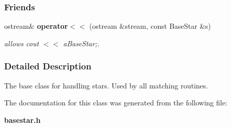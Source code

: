 \subsubsection*{Friends}
\begin{CompactItemize}
\item 
{}
ostream\& {\bf operator$<$$<$} (ostream \&stream, const Base\-Star \&s)\label{class_basestar_l0}

\begin{CompactList}\small\item\em allows cout $<$$<$ a\-Base\-Star;.\item\end{CompactList}\end{CompactItemize}


\subsubsection{Detailed Description}
The base class for handling stars. Used by all matching routines.



The documentation for this class was generated from the following file:\begin{CompactItemize}
\item 
{\bf basestar.h}\end{CompactItemize}
